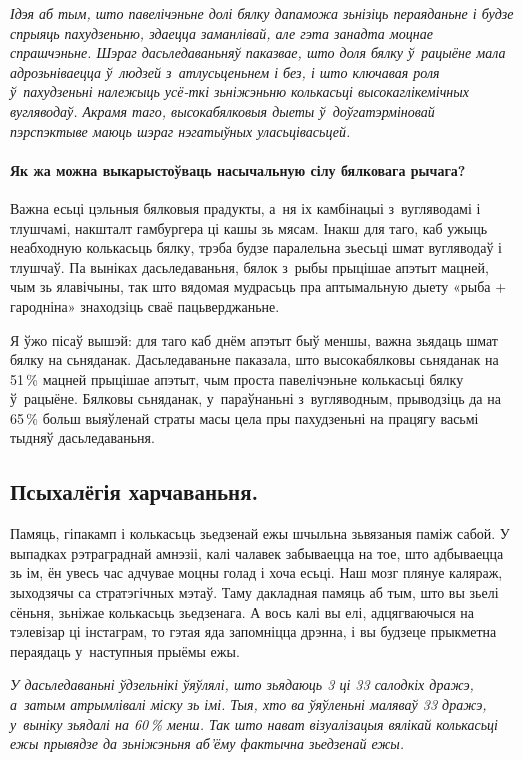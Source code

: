\emph{Ідэя аб тым, што павелічэньне долі бялку дапаможа зьнізіць пераяданьне і будзе спрыяць пахудзеньню, здаецца заманлівай, але гэта занадта моцнае спрашчэньне. Шэраг дасьледаваньняў паказвае, што доля бялку ў~рацыёне мала адрозьніваецца ў~людзей з~атлусьценьнем і без, і што ключавая роля ў~пахудзеньні належыць усё-ткі зьніжэньню колькасьці высокаглікемічных вугляводаў. Акрамя таго, высокабялковыя дыеты ў~доўгатэрміновай пэрспэктыве маюць шэраг нэгатыўных уласьцівасьцей.}

\paragraph{Як жа можна выкарыстоўваць насычальную сілу бялковага рычага?} Важна есьці цэльныя бялковыя прадукты, а~ня іх камбінацыі з~вугляводамі і тлушчамі, накшталт гамбургера ці кашы зь мясам. Інакш для таго, каб ужыць неабходную колькасьць бялку, трэба будзе паралельна зьесьці шмат вугляводаў і тлушчаў. Па выніках дасьледаваньня, бялок з~рыбы прыцішае апэтыт мацней, чым зь ялавічыны, так што вядомая мудрасьць пра аптымальную дыету «рыба + гародніна» знаходзіць сваё пацьверджаньне.

Я ўжо пісаў вышэй: для таго каб днём апэтыт быў меншы, важна зьядаць шмат бялку на сьняданак. Дасьледаваньне паказала, што высокабялковы сьняданак на 51\,\% мацней прыцішае апэтыт, чым проста павелічэньне колькасьці бялку ў~рацыёне. Бялковы сьняданак, у~параўнаньні з~вугляводным, прыводзіць да на 65\,\% больш выяўленай страты масы цела пры пахудзеньні на працягу васьмі тыдняў дасьледаваньня.

\subsection*{Псыхалёгія харчаваньня.}
Памяць, гіпакамп і колькасьць зьедзенай ежы шчыльна зьвязаныя паміж сабой. У выпадках рэтраграднай амнэзіі, калі чалавек забываецца на тое, што адбываецца зь ім, ён увесь час адчувае моцны голад і хоча есьці. Наш мозг плянуе каляраж, зыходзячы са стратэгічных мэтаў. Таму дакладная памяць аб тым, што вы зьелі сёньня, зьніжае колькасьць зьедзенага. А вось калі вы елі, адцягваючыся на тэлевізар ці інстаграм, то гэтая яда запомніцца дрэнна, і вы будзеце прыкметна пераядаць у~наступныя прыёмы ежы.

\emph{У дасьледаваньні ўдзельнікі ўяўлялі, што зьядаюць 3 ці 33 салодкіх дражэ, а~затым атрымлівалі міску зь імі. Тыя, хто ва ўяўленьні маляваў 33 дражэ, у~выніку зьядалі на 60\,\% менш. Так што нават візуалізацыя вялікай колькасьці ежы прывядзе да зьніжэньня аб'ёму фактычна зьедзенай ежы.}

